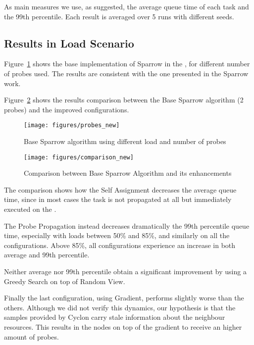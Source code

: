 \documentclass[conference]{IEEEtran}
\begin{document}
  As main measures we use, as suggested, the average queue time of each
  task and the 99th percentile. Each result is averaged over 5 runs with
  different seeds.

\subsection{Results in Load Scenario}

  Figure~\ref{fig:probes} shows the base implementation of Sparrow in the
  , for different number of probes used. The
  results are consistent with the one presented in the Sparrow work.

  Figure~\ref{fig:comparison} shows the results comparison between the Base
  Sparrow algorithm (2 probes) and the improved configurations.

  \begin{figure}
  \begin{center}
  \texttt{[image: figures/probes\_new]}
  \caption{Base Sparrow algorithm using different load and number of probes}
  \label{fig:probes}
  \end{center}
  \end{figure}

  \begin{figure}
  \begin{center}
  \texttt{[image: figures/comparison\_new]}
  \caption{Comparison between Base Sparrow Algorithm and its enhancements}
  \label{fig:comparison}
  \end{center}
  \end{figure}

  The comparison shows how the Self Assignment decreases the average queue
  time, since in most cases the task is not propagated at all but
  immediately executed on the \tmast.

  The Probe Propagation instead decreases dramatically the 99th percentile
  queue time, especially with loads between 50\% and 85\%, and similarly on
  all the configurations. Above 85\%, all configurations experience an
  increase in both average and 99th percentile. 

  Neither average nor 99th percentile obtain a significant improvement by
  using a Greedy Search on top of Random View.

  Finally the last configuration, using Gradient, performs slightly worse
  than the others. Although we did not verify this dynamics, our hypothesis
  is that the samples provided by Cyclon carry stale information about the
  neighbour resources. This results in the nodes on top of the gradient to
  receive an higher amount of probes. 
\end{document}
